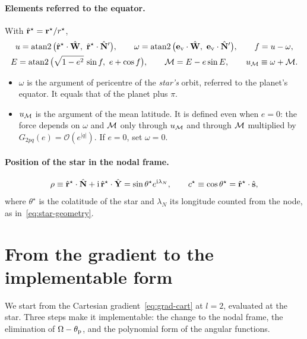 \paragraph{Elements referred to the equator.} With $\hat{\mathbf r}^\star=\mathbf r^\star/r^\star$,
\begin{gather}
  u=\operatorname{atan2}\big(\hat{\vr}^\star\cdot\hat{\mathbf W},\ \hat{\vr}^\star\cdot\hat{\mathbf N}'\big),\qquad
  \omega=\operatorname{atan2}\big(\mathbf e_{\rm v}\cdot\hat{\mathbf W},\ \mathbf e_{\rm v}\cdot\hat{\mathbf N}'\big),\qquad f=u-\omega, \label{eq:elements-angles}\\
  E=\operatorname{atan2}\big(\sqrt{1-e^2}\,\sin f,\ e+\cos f\big),\qquad \M=E-e\sin E,\qquad u_\M\equiv\omega+\M. \notag
\end{gather}
\begin{itemize}
  \item $\omega$ is the argument of pericentre of the \emph{star's} orbit, referred to the planet's equator. It equals that of the planet plus $\pi$.
  \item $u_{\mathcal{M}}$ is the argument of the mean latitude. It is defined even when $e=0$: the force depends on $\omega$ and $\mathcal{M}$ only through $u_{\mathcal{M}}$ and through $\mathcal{M}$ multiplied by $G_{2pq}(e)=\mathcal O(e^{|q|})$. If $e=0$, set $\omega=0$.
\end{itemize}

\paragraph{Position of the star in the nodal frame.}
\begin{equation}
  \rho\equiv\hat{\mathbf r}^\star\cdot\hat{\mathbf N}+\mathrm{i}\,\hat{\mathbf r}^\star\cdot\hat{\mathbf Y}=\sin\theta^\star e^{\mathrm{i}\lambda_N},\qquad
  c^\star\equiv\cos\theta^\star=\hat{\mathbf r}^\star\cdot\hat{\mathbf s}, \label{eq:rho}
\end{equation}
where $\theta^\star$ is the colatitude of the star and $\lambda_N$ its longitude counted from the node, as in~\eqref{eq:star-geometry}.

\section{From the gradient to the implementable form}\label{sec:implementable}
We start from the Cartesian gradient~\eqref{eq:grad-cart} at $l=2$, evaluated at the star. Three steps make it implementable: the change to the nodal frame, the elimination of $\Omega-\theta_{\mathrm p}$, and the polynomial form of the angular functions.

